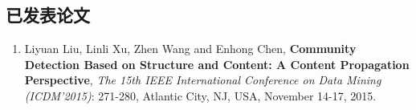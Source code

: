 ﻿\iffalse



\fi


\begin{publications}

\section*{已发表论文}

\begin{enumerate}
\item Liyuan Liu, Linli Xu, Zhen Wang and Enhong Chen, \textbf{Community Detection Based on Structure and Content: A Content Propagation Perspective}, \emph{The 15th IEEE International Conference on Data Mining (ICDM'2015)}: 271-280, Atlantic City, NJ, USA, November 14-17, 2015.
\end{enumerate}

\end{publications}
